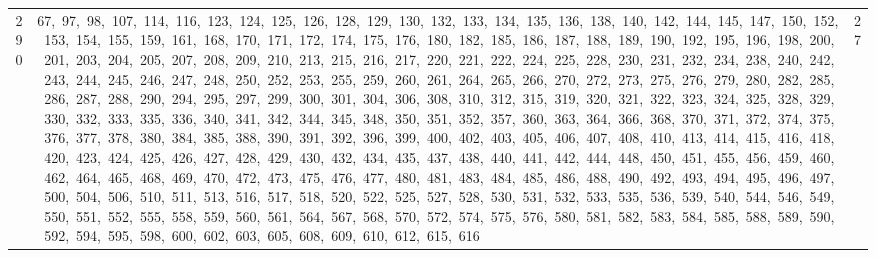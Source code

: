\begin{longtable}{c|p{}|r}
290 & 67,\ 97,\ 98,\ 107,\ 114,\ 116,\ 123,\ 124,\ 125,\ 126,\ 128,\ 129,\ 130,\ 132,\ 133,\ 134,\ 135,\ 136,\ 138,\ 140,\ 142,\ 144,\ 145,\ 147,\ 150,\ 152,\ 153,\ 154,\ 155,\ 159,\ 161,\ 168,\ 170,\ 171,\ 172,\ 174,\ 175,\ 176,\ 180,\ 182,\ 185,\ 186,\ 187,\ 188,\ 189,\ 190,\ 192,\ 195,\ 196,\ 198,\ 200,\ 201,\ 203,\ 204,\ 205,\ 207,\ 208,\ 209,\ 210,\ 213,\ 215,\ 216,\ 217,\ 220,\ 221,\ 222,\ 224,\ 225,\ 228,\ 230,\ 231,\ 232,\ 234,\ 238,\ 240,\ 242,\ 243,\ 244,\ 245,\ 246,\ 247,\ 248,\ 250,\ 252,\ 253,\ 255,\ 259,\ 260,\ 261,\ 264,\ 265,\ 266,\ 270,\ 272,\ 273,\ 275,\ 276,\ 279,\ 280,\ 282,\ 285,\ 286,\ 287,\ 288,\ 290,\ 294,\ 295,\ 297,\ 299,\ 300,\ 301,\ 304,\ 306,\ 308,\ 310,\ 312,\ 315,\ 319,\ 320,\ 321,\ 322,\ 323,\ 324,\ 325,\ 328,\ 329,\ 330,\ 332,\ 333,\ 335,\ 336,\ 340,\ 341,\ 342,\ 344,\ 345,\ 348,\ 350,\ 351,\ 352,\ 357,\ 360,\ 363,\ 364,\ 366,\ 368,\ 370,\ 371,\ 372,\ 374,\ 375,\ 376,\ 377,\ 378,\ 380,\ 384,\ 385,\ 388,\ 390,\ 391,\ 392,\ 396,\ 399,\ 400,\ 402,\ 403,\ 405,\ 406,\ 407,\ 408,\ 410,\ 413,\ 414,\ 415,\ 416,\ 418,\ 420,\ 423,\ 424,\ 425,\ 426,\ 427,\ 428,\ 429,\ 430,\ 432,\ 434,\ 435,\ 437,\ 438,\ 440,\ 441,\ 442,\ 444,\ 448,\ 450,\ 451,\ 455,\ 456,\ 459,\ 460,\ 462,\ 464,\ 465,\ 468,\ 469,\ 470,\ 472,\ 473,\ 475,\ 476,\ 477,\ 480,\ 481,\ 483,\ 484,\ 485,\ 486,\ 488,\ 490,\ 492,\ 493,\ 494,\ 495,\ 496,\ 497,\ 500,\ 504,\ 506,\ 510,\ 511,\ 513,\ 516,\ 517,\ 518,\ 520,\ 522,\ 525,\ 527,\ 528,\ 530,\ 531,\ 532,\ 533,\ 535,\ 536,\ 539,\ 540,\ 544,\ 546,\ 549,\ 550,\ 551,\ 552,\ 555,\ 558,\ 559,\ 560,\ 561,\ 564,\ 567,\ 568,\ 570,\ 572,\ 574,\ 575,\ 576,\ 580,\ 581,\ 582,\ 583,\ 584,\ 585,\ 588,\ 589,\ 590,\ 592,\ 594,\ 595,\ 598,\ 600,\ 602,\ 603,\ 605,\ 608,\ 609,\ 610,\ 612,\ 615,\ 616 & 27 \\

\end{longtable}
